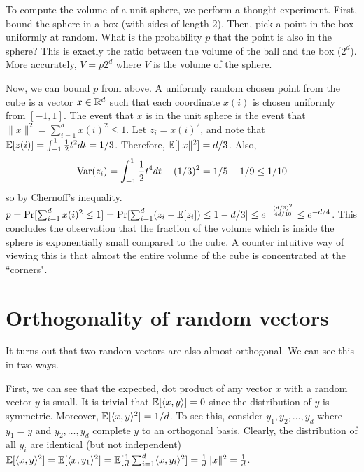 \documentclass{article}
\begin{document}
To compute the volume of a unit sphere, we perform a thought experiment.
First, bound the sphere in a box (with sides of length $2$).
Then, pick a point in the box uniformly at random. What is the probability $p$ that
the point is also in the sphere? This is exactly the ratio between the volume of the ball and the box ($2^d$).
More accurately, $V = p2^d$ where $V$ is the volume of the sphere.

Now, we can bound $p$ from above. 
A uniformly random chosen point from the cube is a vector $x \in {\mathbb{R}}^d$ such that each coordinate $x(i)$
is chosen uniformly from $[-1,1]$. The event that $x$ is in the unit sphere is the event that $\|x\|^2 = \sum_{i=1}^{d}x(i)^2 \le 1$.
Let $z_i = x(i)^2$, and note that 
${\mathbb E}[z(i)] = \int_{-1}^{1}\frac{1}{2}t^2 dt = 1/3$. Therefore, ${\mathbb E}[\|x\|^2] = d/3$. 
Also, 
\[
{\operatorname{Var}}(z_i)  = \int_{-1}^{1}\frac{1}{2}t^4 dt  - (1/3)^2  = 1/5 - 1/9 \le 1/10
\]
so by Chernoff's inequality.
$p = \Pr[\sum_{i=1}^{d}x(i)^2 \le 1]  = \Pr[\sum_{i=1}^{d}(z_i -{\mathbb E}[z_i] ) \le 1-d/3] \le e^{-\frac{(d/3)^2}{4d/10}} \le e^{-d/4}$.
This concludes the observation that the fraction of the volume which is inside the sphere is 
exponentially small compared to the cube.
A counter intuitive way of viewing this is that almost the entire volume of the cube is concentrated at the ``corners".

\section{Orthogonality of random vectors}

It turns out that two random vectors are also almost orthogonal.
We can see this in two ways.

First, we can see that the expected, dot product of any vector $x$ with a random vector $y$ is small.
It is trivial that ${\mathbb E}[\langle x,y \rangle] = 0$ since the distribution of $y$ is symmetric.
Moreover, ${\mathbb E}[\langle x,y \rangle^2] = 1/d$.
To see this, consider $y_1,y_2,\ldots,y_d$ where $y_1 = y$ and $y_2,\ldots,y_d$ complete $y$ to an orthogonal basis.
Clearly, the distribution of all $y_i$ are identical (but not independent)
${\mathbb E}[\langle x,y \rangle^2] = {\mathbb E}[\langle x,y_1\rangle^2] = {\mathbb E}[\frac{1}{d}\sum_{i=1}^{d}\langle x,y_i\rangle^2] = \frac{1}{d}\|x\|^2 = \frac{1}{d}$.
\end{document}
